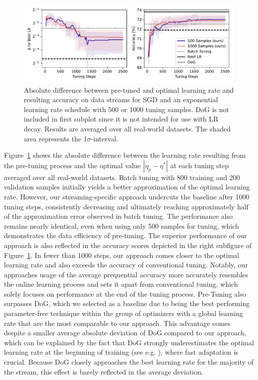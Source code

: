 \documentclass{article} %
\begin{document}
\begin{figure}[hb]
   \centering
   \includegraphics[width=\textwidth]{figures/pretune_1x64_acc_lr_exp_schedule.pdf}
   \caption{Absolute difference between pre-tuned and optimal learning rate and resulting accuracy on data streams for SGD and an exponential learning rate schedule with 500 or 1000 tuning samples. DoG is not included in first subplot since it is not intended for use with LR decay. Results are averaged over all real-world datasets. The shaded area represents the 1$\sigma$-interval.}\label{fig:pretune_lr_accuracy}
\end{figure}
Figure~\ref{fig:pretune_lr_accuracy} shows the absolute difference between the learning rate resulting from the pre-tuning process and the optimal value $|\eta_p - \eta^*|$ at each tuning step averaged over all real-world datasets.
Batch tuning with 800 training and 200 validation samples initially yields a better approximation of the optimal learning rate. However, our streaming-specific approach undercuts the baseline after 1000 tuning steps, consistently decreasing and ultimately reaching approximately half of the approximation error observed in batch tuning.
The performance also remains nearly identical, even when using only 500 samples for tuning, which demonstrates the data efficiency of pre-tuning.
The superior performance of our approach is also reflected in the accuracy scores depicted in the right subfigure of Figure~\ref{fig:pretune_lr_accuracy}.
In fewer than 1000 steps, our approach comes closer to the optimal learning rate and also exceeds the accuracy of conventional tuning.
Notably, our approaches usage of the average prequential accuracy more accurately resembles the online learning process and sets it apart from conventional tuning, which solely focuses on performance at the end of the tuning process.
Pre-Tuning also surpasses DoG, which we selected as a baseline due to being the best performing parameter-free technique within the group of optimizers with a global learning rate that are the most comparable to our approach.
This advantage comes despite a smaller average absolute deviation of DoG compared to our approach, which can be explained by the fact that DoG strongly underestimates the optimal learning rate at the beginning of training (see e.g. ), where fast adaptation is crucial.
Because DoG closely approaches the best learning rate for the majority of the stream, this effect is barely reflected in the average deviation.
\end{document}
